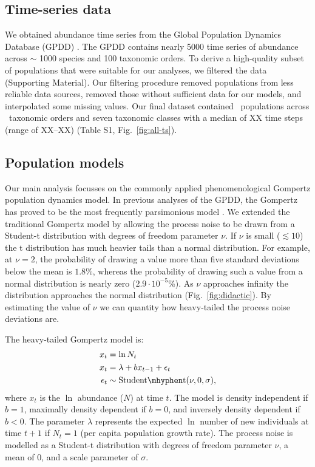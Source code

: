 \subsection{Time-series data}

We obtained abundance time series from the Global Population Dynamics Database (GPDD) \citep{gpdd2010}. The GPDD contains nearly 5000 time series of abundance across $\sim$ 1000 species and 100 taxonomic orders. To derive a high-quality subset of populations that were suitable for our analyses, we filtered the data (Supporting Material). Our filtering procedure removed populations from less reliable data sources, removed those without sufficient data for our models, and interpolated some missing values. Our final dataset contained \NPops~populations across \NOrders~taxonomic orders and seven taxonomic classes with a median of XX time steps (range of XX--XX) (Table S1, Fig.~\ref{fig:all-ts}).

\subsection{Population models}

Our main analysis focusses on the commonly applied phenomenological Gompertz population dynamics model. In previous analyses of the GPDD, the Gompertz has proved to be the most frequently parsimonious model \citep{brook2006}. We extended the traditional Gompertz model by allowing the process noise to be drawn from a Student-t distribution with degrees of freedom parameter $\nu$. If $\nu$ is small ($\lesssim 10$) the t distribution has much heavier tails than a normal distribution. For example, at $\nu = 2$, the probability of drawing a value more than five standard deviations below the mean is $1.8$\%, whereas the probability of drawing such a value from a normal distribution is nearly zero ($2.9\cdot10^{-5}$\%). As $\nu$ approaches infinity the distribution approaches the normal distribution (Fig.~\ref{fig:didactic}). By estimating the value of $\nu$ we can quantity how heavy-tailed the process noise deviations are.

The heavy-tailed Gompertz model is: 
\begin{align*}
x_t &= \ln N_t\\
x_t &= \lambda + b x_{t-1} + \epsilon_t\\
\epsilon_t &\sim \mathrm{Student\mhyphen t}(\nu, 0, \sigma),
\end{align*}
where $x_t$ is the $\ln$ abundance ($N$) at time $t$. The model is density independent if $b = 1$, maximally density dependent if $b = 0$, and inversely density dependent if $b < 0$. The parameter $\lambda$ represents the expected $\ln$ number of new individuals at time $t + 1$ if $N_t = 1$ (per capita population growth rate). The process noise is modelled as a Student-t distribution with degrees of freedom parameter $\nu$, a mean of $0$, and a scale parameter of $\sigma$.

